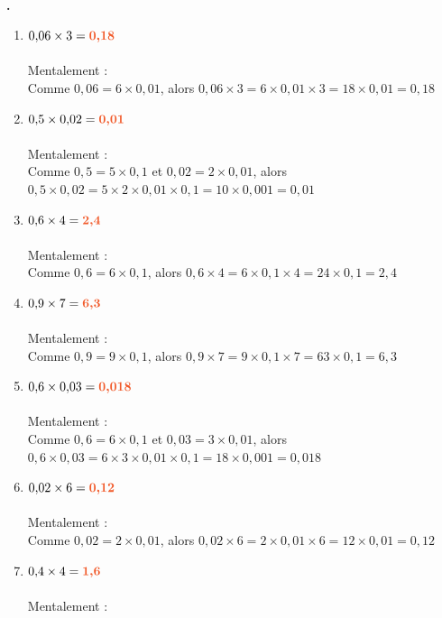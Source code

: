 \documentclass[10pt,a4paper]{article}
\newcounter{exo}
\newcommand{\exo}[1][]{%
  \refstepcounter{exo}%
  \textbf{\textcolor{Couleur8}{\\[0.3cm]\theexo.}}%
  \if\relax\detokenize{#1}\relax\else\ \textbf{#1}\fi\ %
}
\begin{document}
\exo  
\begin{enumerate}[itemsep=1em]
	\item $0{,}06\times 3={\color[HTML]{f15929}\boldsymbol{0{,}18}}$\\{\color[HTML]{216D9A}
    \\ Mentalement : \\
   Comme $0{,}06=6\times 0,01$, alors $0{,}06\times 3=6\times 0,01\times 3 =
   18\times 0,01=0{,}18$ }
	\item $0{,}5\times 0{,}02={\color[HTML]{f15929}\boldsymbol{0{,}01}}$\\{\color[HTML]{216D9A}
    \\ Mentalement : \\
   Comme $0{,}5=5\times 0,1$ et $0{,}02=2\times 0,01$,
    alors $0{,}5\times 0{,}02=5\times 2\times 0,01 \times 0,1=10\times 0,001=0{,}01$ }
	\item $0{,}6\times 4={\color[HTML]{f15929}\boldsymbol{2{,}4}}$\\{\color[HTML]{216D9A}
    \\ Mentalement : \\
   Comme $0{,}6=6\times 0,1$, alors $0{,}6\times 4=6\times 0,1\times 4 =
   24\times 0,1=2{,}4$ }
	\item $0{,}9\times 7={\color[HTML]{f15929}\boldsymbol{6{,}3}}$\\{\color[HTML]{216D9A}
    \\ Mentalement : \\
   Comme $0{,}9=9\times 0,1$, alors $0{,}9\times 7=9\times 0,1\times 7 =
   63\times 0,1=6{,}3$ }
	\item $0{,}6\times 0{,}03={\color[HTML]{f15929}\boldsymbol{0{,}018}}$\\{\color[HTML]{216D9A}
    \\ Mentalement : \\
   Comme $0{,}6=6\times 0,1$ et $0{,}03=3\times 0,01$,
    alors $0{,}6\times 0{,}03=6\times 3\times 0,01 \times 0,1=18\times 0,001=0{,}018$ }
	\item $0{,}02\times 6={\color[HTML]{f15929}\boldsymbol{0{,}12}}$\\{\color[HTML]{216D9A}
    \\ Mentalement : \\
   Comme $0{,}02=2\times 0,01$, alors $0{,}02\times 6=2\times 0,01\times 6 =
   12\times 0,01=0{,}12$ }
	\item $0{,}4\times 4={\color[HTML]{f15929}\boldsymbol{1{,}6}}$\\{\color[HTML]{216D9A}
    \\ Mentalement : \\
}
\end{enumerate}
\end{document}
